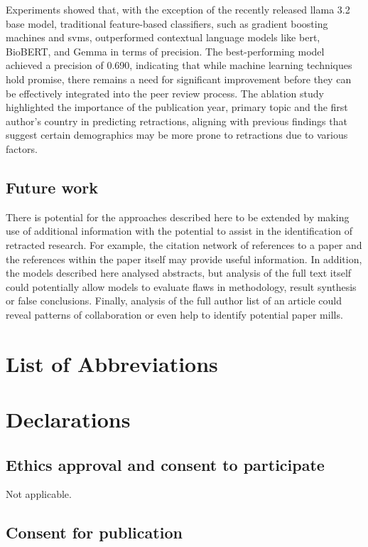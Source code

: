\documentclass[pdflatex,sn-mathphys-num]{sn-jnl}
\begin{document}
Experiments showed that, with the exception of the recently released \gls*{llama} 3.2 base model, traditional feature-based classifiers, such as gradient boosting machines and \glspl*{svm}, outperformed contextual language models like \gls*{bert}, BioBERT, and Gemma in terms of precision. The best-performing model achieved a precision of 0.690, indicating that while machine learning techniques hold promise, there remains a need for significant improvement before they can be effectively integrated into the peer review process. The ablation study highlighted the importance of the publication year, primary topic and the first author's country in predicting retractions, aligning with previous findings that suggest certain demographics may be more prone to retractions due to various factors.

\subsection{Future work}

There is potential for the approaches described here to be extended by making use of additional information with the potential to assist in the identification of retracted research. For example, the citation network of references to a paper and the references within the paper itself may provide useful information. In addition, the models described here analysed abstracts, but analysis of the full text itself could potentially allow models to evaluate flaws in methodology, result synthesis or false conclusions. Finally, analysis of the full author list of an article could reveal patterns of collaboration or even help to identify potential paper mills.

\section{List of Abbreviations}

\printglossary[type=\acronymtype]

\section*{Declarations}
\subsection*{Ethics approval and consent to participate}

Not applicable.

\subsection*{Consent for publication}
\end{document}
